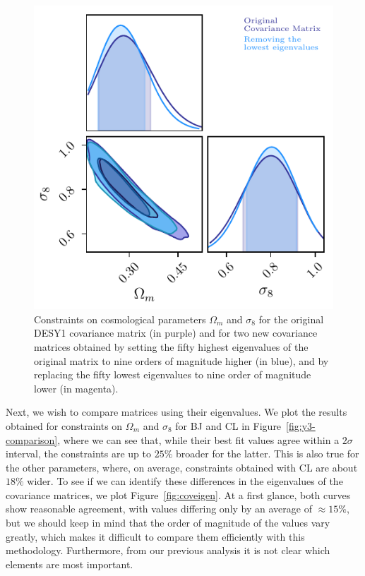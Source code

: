 \documentclass[twocolumn]{\docclass}
\newcommand{\rf}[1]{\ref{fig:#1}}
\begin{document}
\begin{figure}
\includegraphics[width=0.9\columnwidth]{Eigenvalues.pdf}
\caption{Constraints on cosmological parameters $\Omega_m$ and $\sigma_8$ for the original DESY1 covariance matrix (in purple) and for two new covariance matrices obtained by setting the fifty highest eigenvalues of the original matrix to nine orders of magnitude higher (in blue), and by replacing the fifty lowest eigenvalues to nine order of magnitude lower (in magenta). \label{fig:eigenvalues}}
\end{figure}


Next, we wish to compare matrices using their eigenvalues. We plot the results obtained for constraints on $\Omega_m$ and $\sigma_8$ for BJ and CL in Figure~\rf{y3-comparison}, where we can see that, while their best fit values agree within a $2 \sigma$ interval, the constraints are up to $25 \%$ broader for the latter. This is also true for the other parameters, where, on average, constraints obtained with CL are about $18 \%$ wider. To see if we can identify these differences in the eigenvalues of the covariance matrices, we plot Figure~\rf{coveigen}. At a first glance, both curves show reasonable agreement, with values differing only by an average of $\approx 15 \%$, but we should keep in mind that the order of magnitude of the values vary greatly, which makes it difficult to compare them efficiently with this methodology. Furthermore, from our previous analysis it is not clear which elements are most important.
\end{document}
